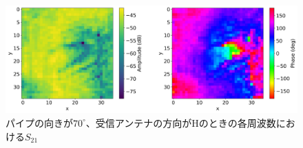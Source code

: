 \documentclass[11pt,a4paper,uplatex]{ujarticle}
\begin{document}
\begin{figure}[tbp]
\begin{minipage}[b]{0.995\textwidth}
      \includegraphics[keepaspectratio, width=140mm]{Images/python/yokonarabe/019/170.png}
    \end{minipage}
    \caption{パイプの向きが$70^{\circ}$、受信アンテナの方向がHのときの各周波数における$S_{21}$}
  \end{figure}
\end{document}
